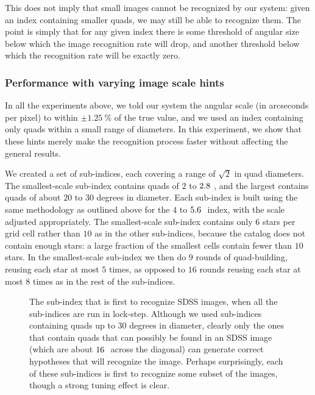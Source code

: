 This does not imply that small images cannot be recognized by our
system: given an index containing smaller quads, we may still be able
to recognize them.  The point is simply that for any given index there
is some threshold of angular size below which the image recognition
rate will drop, and another threshold below which the recognition rate
will be exactly zero.


\subsubsection{Performance with varying image scale hints}
\label{sec:sizehints}


In all the experiments above, we told our system the angular scale (in
arcseconds per pixel) to within $\pm1.25~\percent$ of the true value,
and we used an index containing only quads within a small range of
diameters.  In this experiment, we show that these hints merely make
the recognition process faster without affecting the general results.


We created a set of sub-indices, each covering a range of $\sqrt{2}$
in quad diameters.  The smallest-scale sub-index contains quads of $2$
to $2.8~$, and the largest contains quads of about $20$ to $30$
degrees in diameter.  Each sub-index is built using the same
methodology as outlined above for the $4$ to $5.6~$ index, with
the scale adjusted appropriately.  The smallest-scale sub-index
contains only $6$ stars per \healpix grid cell rather than $10$ as in
the other sub-indices, because the \usnob catalog does not contain
enough stars: a large fraction of the smallest cells contain fewer
than $10$ stars.  In the smallest-scale sub-index we then do $9$
rounds of quad-building, reusing each star at most $5$ times, as
opposed to $16$ rounds reusing each star at most $8$ times as in the
rest of the sub-indices.


\begin{figure}[htp]
\begin{center}
    \sdsssizehintsindexfig
\end{center}
\caption{The sub-index that is first to recognize SDSS images, when all
the sub-indices are run in lock-step.  Although we used sub-indices
containing quads up to $30$ degrees in diameter, clearly only the ones
that contain quads that can possibly be found in an SDSS image (which
are about $16~$ across the diagonal) can generate correct
hypotheses that will recognize the image.  Perhaps surprisingly, each
of these sub-indices is first to recognize some subset of the images,
though a strong tuning effect is clear.
\label{fig:sdsssizehintsindex}}
\end{figure}



